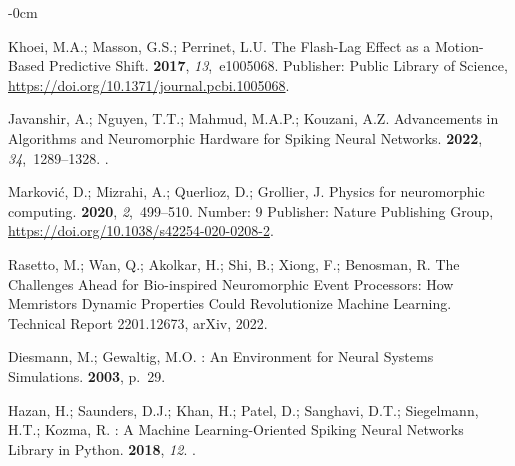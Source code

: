 \documentclass[brainsci, %
               review,submit,pdftex,moreauthors
               ]{Definitions/mdpi}
\begin{document}
\begin{adjustwidth}{-\extralength}{0cm}
\begin{thebibliography}{999}
  Khoei, M.A.; Masson, G.S.; Perrinet, L.U.
  \newblock The {Flash}-{Lag} {Effect} as a {Motion}-{Based} {Predictive}
    {Shift}.
   {\bf 2017}, {\em 13},~e1005068.
  \newblock Publisher: Public Library of Science,
    {\url{https://doi.org/10.1371/journal.pcbi.1005068}}.
  
  Javanshir, A.; Nguyen, T.T.; Mahmud, M.A.P.; Kouzani, A.Z.
  \newblock Advancements in {Algorithms} and {Neuromorphic} {Hardware} for
    {Spiking} {Neural} {Networks}.
   {\bf 2022}, {\em 34},~1289--1328.
  .
  
  Marković, D.; Mizrahi, A.; Querlioz, D.; Grollier, J.
  \newblock Physics for neuromorphic computing.
   {\bf 2020}, {\em 2},~499--510.
  \newblock Number: 9 Publisher: Nature Publishing Group,
    {\url{https://doi.org/10.1038/s42254-020-0208-2}}.
  
  Rasetto, M.; Wan, Q.; Akolkar, H.; Shi, B.; Xiong, F.; Benosman, R.
  \newblock The {Challenges} {Ahead} for {Bio}-inspired {Neuromorphic} {Event}
    {Processors}: {How} {Memristors} {Dynamic} {Properties} {Could}
    {Revolutionize} {Machine} {Learning}.
  \newblock Technical Report 2201.12673, arXiv,  2022.
  
  Diesmann, M.; Gewaltig, M.O.
  : {An} {Environment} for {Neural} {Systems} {Simulations}.
   {\bf
    2003}, p.~29.
  
  Hazan, H.; Saunders, D.J.; Khan, H.; Patel, D.; Sanghavi, D.T.; Siegelmann,
    H.T.; Kozma, R.
  : {A} {Machine} {Learning}-{Oriented} {Spiking} {Neural}
    {Networks} {Library} in {Python}.
   {\bf 2018}, {\em 12}.
  .
  

\end{thebibliography}
\end{adjustwidth}
\end{document}

